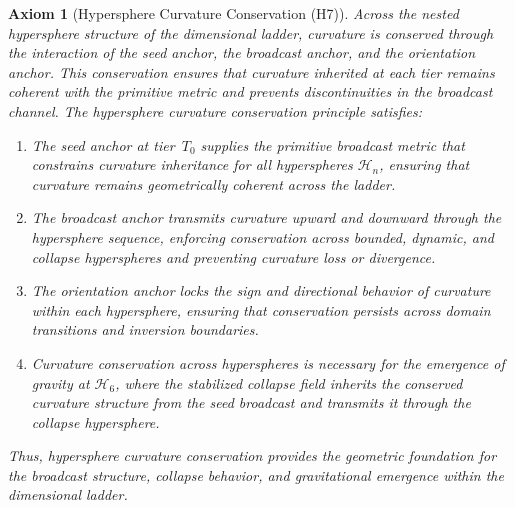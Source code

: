 \documentclass[final,onefignum,onetabnum]{siamart}
\newtheorem{axiom}{Axiom}
\begin{document}
\begin{axiom}[Hypersphere Curvature Conservation (H7)]
Across the nested hypersphere structure of the dimensional ladder, curvature is conserved through the interaction of the seed anchor, the broadcast anchor, and the orientation anchor. This conservation ensures that curvature inherited at each tier remains coherent with the primitive metric and prevents discontinuities in the broadcast channel. The hypersphere curvature conservation principle satisfies:

\begin{enumerate}
    \item The seed anchor at tier~$T_{0}$ supplies the primitive broadcast metric that constrains curvature inheritance for all hyperspheres $\mathcal{H}_{n}$, ensuring that curvature remains geometrically coherent across the ladder.
    \item The broadcast anchor transmits curvature upward and downward through the hypersphere sequence, enforcing conservation across bounded, dynamic, and collapse hyperspheres and preventing curvature loss or divergence.
    \item The orientation anchor locks the sign and directional behavior of curvature within each hypersphere, ensuring that conservation persists across domain transitions and inversion boundaries.
    \item Curvature conservation across hyperspheres is necessary for the emergence of gravity at $\mathcal{H}_{6}$, where the stabilized collapse field inherits the conserved curvature structure from the seed broadcast and transmits it through the collapse hypersphere.
\end{enumerate}

Thus, hypersphere curvature conservation provides the geometric foundation for the broadcast structure, collapse behavior, and gravitational emergence within the dimensional ladder.
\end{axiom}
\end{document}
